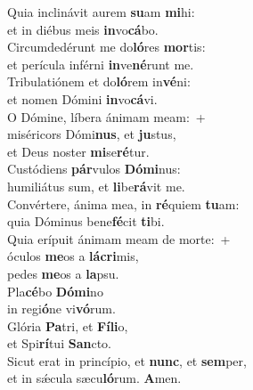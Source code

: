 \evenverse Quia inclinávit aurem \textbf{su}am \textbf{mi}hi:~\*\\
\evenverse et in diébus meis \textbf{in}vo\textbf{cá}bo.\\
\oddverse Circumdedérunt me do\textbf{ló}res \textbf{mor}tis:~\*\\
\oddverse et perícula inférni \textbf{in}ve\textbf{né}runt me.\\
\evenverse Tribulatiónem et do\textbf{ló}rem in\textbf{vé}ni:~\*\\
\evenverse et nomen Dómini \textbf{in}vo\textbf{cá}vi.\\
\oddverse O Dómine, líbera ánimam meam:~+\\
\oddverse  miséricors Dómi\textbf{nus}, et \textbf{ju}stus,~\*\\
\oddverse et Deus noster \textbf{mi}se\textbf{ré}tur.\\
\evenverse Custódiens \textbf{pár}vulos \textbf{Dó}\textbf{mi}nus:~\*\\
\evenverse humiliátus sum, et \textbf{li}be\textbf{rá}vit me.\\
\oddverse Convértere, ánima mea, in \textbf{ré}quiem \textbf{tu}am:~\*\\
\oddverse quia Dóminus bene\textbf{fé}cit \textbf{ti}bi.\\
\evenverse Quia erípuit ánimam meam de morte:~+\\
\evenverse  óculos \textbf{me}os a \textbf{lá}\textbf{cri}mis,~\*\\
\evenverse pedes \textbf{me}os a \textbf{la}psu.\\
\oddverse Pla\textbf{cé}bo \textbf{Dó}\textbf{mi}no~\*\\
\oddverse in regi\textbf{ó}ne vi\textbf{vó}rum.\\
\evenverse Glória \textbf{Pa}tri, et \textbf{Fí}\textbf{li}o,~\*\\
\evenverse et Spi\textbf{rí}tui \textbf{San}cto.\\
\oddverse Sicut erat in princípio, et \textbf{nunc}, et \textbf{sem}per,~\*\\
\oddverse et in sǽcula sæcu\textbf{ló}rum. \textbf{A}men.\\
